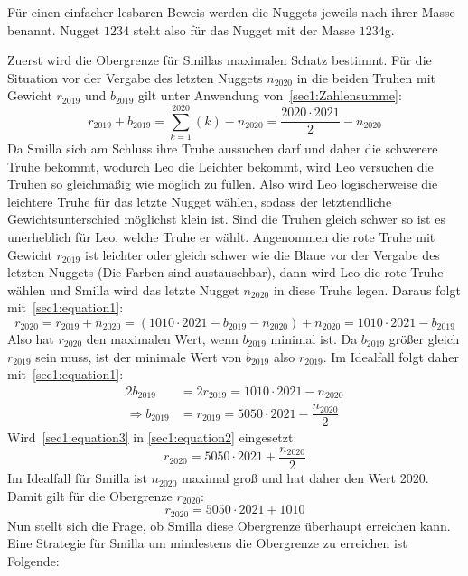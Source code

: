 \documentclass[10pt, a4paper]{amsart}
\makeatletter
\renewenvironment{proof}[1][\proofname]{\par
\pushQED{\qed}%
\normalfont \topsep6\p@\@plus6\p@\relax
\trivlist
\item\relax
{\bfseries#1}\hspace\labelsep\ignorespaces
}{%
\popQED\endtrivlist\@endpefalse
}
\makeatother
\begin{document}
\begin{proof}
  Für einen einfacher lesbaren Beweis werden die Nuggets jeweils nach ihrer
  Masse benannt. Nugget $1234$ steht also für das Nugget mit der Masse $1234$g.
  
  Zuerst wird die Obergrenze für Smillas maximalen Schatz bestimmt. Für die
  Situation vor der Vergabe des letzten Nuggets $n_{2020}$ in die beiden Truhen
  mit Gewicht $r_{2019}$ und $b_{2019}$ gilt unter Anwendung
  von~\autoref{sec1:Zahlensumme}:
  \begin{equation}\label{sec1:equation1}
    r_{2019}+b_{2019}=\sum_{k=1}^{2020}\left(k\right)-n_{2020}=\dfrac{2020\cdot2021}{2}-n_{2020}
  \end{equation}
  Da Smilla sich am Schluss ihre Truhe aussuchen darf und daher die schwerere
  Truhe bekommt, wodurch Leo die Leichter bekommt, wird Leo versuchen die Truhen
  so gleichmäßig wie möglich zu füllen. Also wird Leo logischerweise die
  leichtere Truhe für das letzte Nugget wählen, sodass der letztendliche
  Gewichtsunterschied möglichst klein ist. Sind die Truhen gleich schwer so ist
  es unerheblich für Leo, welche Truhe er wählt. Angenommen die rote Truhe mit
  Gewicht $r_{2019}$ ist leichter oder gleich schwer wie die Blaue vor der
  Vergabe des letzten Nuggets (Die Farben sind austauschbar), dann wird Leo die
  rote Truhe wählen und Smilla wird das letzte Nugget $n_{2020}$ in diese Truhe
  legen. Daraus folgt mit~\eqref{sec1:equation1}:
  \begin{equation}\label{sec1:equation2}
    r_{2020}=r_{2019}+n_{2020}=(1010\cdot2021-b_{2019}-n_{2020})+n_{2020}=1010\cdot2021-b_{2019}
  \end{equation}
  Also hat $r_{2020}$ den maximalen Wert, wenn $b_{2019}$ minimal ist. Da
  $b_{2019}$ größer gleich $r_{2019}$ sein muss, ist der minimale Wert von
  $b_{2019}$ also $r_{2019}$. Im Idealfall folgt daher
  mit~\eqref{sec1:equation1}:
  \begin{equation}\label{sec1:equation3}
    \begin{split}
      2b_{2019} &= 2r_{2019} =1010\cdot2021-n_{2020}\\
      \Rightarrow b_{2019} &= r_{2019}=5050\cdot2021-\dfrac{n_{2020}}{2}
    \end{split}
  \end{equation}
  Wird~\eqref{sec1:equation3} in \eqref{sec1:equation2} eingesetzt:
  \begin{equation*}
    r_{2020}=5050\cdot2021+\dfrac{n_{2020}}{2}
  \end{equation*}
  Im Idealfall für Smilla ist $n_{2020}$ maximal groß und hat daher den Wert
  2020. Damit gilt für die Obergrenze $r_{2020}$:
  \begin{equation*}
    r_{2020}=5050\cdot2021+1010
  \end{equation*}
  Nun stellt sich die Frage, ob Smilla diese Obergrenze überhaupt erreichen
  kann. Eine Strategie für Smilla um mindestens die Obergrenze zu erreichen ist Folgende:\\


\end{proof}
\end{document}
